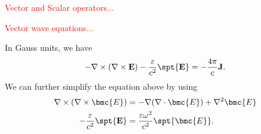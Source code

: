 \textcolor{red}{Vector and Scalar operators...}

\textcolor{red}{Vector wave equations...}

In Gauss units, we have 
\begin{align}
-\nabla\times (\nabla\times \mathbf{E})-\frac{\varepsilon}{c^2} \spt{\mathbf{E}} = 
-\frac{4\pi}{c}\mathbf{J}.
\end{align}
We can further simplify the equation above by using 
\begin{align}
\nabla\times (\nabla\times \bmc{E}) &= -\nabla(\nabla\cdot \bmc{E})+ \nabla^2\bmc{E}\\
-\frac{\varepsilon}{c^2} \spt{\mathbf{E}} &= \frac{\varepsilon\omega^2}{c^2}\spt{\bmc{E}}.
\end{align}